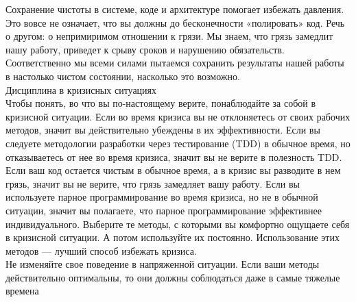 \documentclass{../industrial-development}
\begin{document}
Сохранение чистоты в системе, коде и архитектуре помогает избежать давления. Это вовсе не означает, что вы должны до бесконечности «полировать» код. Речь о другом: о непримиримом отношении к грязи. Мы знаем, что грязь замедлит нашу работу, приведет к срыву сроков и нарушению обязательств. Соответственно мы всеми силами пытаемся сохранить результаты нашей работы в настолько чистом состоянии, насколько это возможно.\\
Дисциплина в кризисных ситуациях\\
Чтобы понять, во что вы по-настоящему верите, понаблюдайте за собой в кризисной ситуации. Если во время кризиса вы не отклоняетесь от своих рабочих методов, значит вы действительно убеждены в их эффективности. Если вы следуете методологии разработки через тестирование (TDD) в обычное время, но отказываетесь от нее во время кризиса, значит вы не верите в полезность TDD. Если ваш код остается чистым в обычное время, а в кризис вы разводите в нем грязь, значит вы не верите, что грязь замедляет вашу работу. Если вы используете парное программирование во время кризиса, но не в обычной ситуации, значит вы полагаете, что парное программирование эффективнее индивидуального. Выберите те методы, с которыми вы комфортно ощущаете себя в кризисной ситуации. А потом используйте их постоянно. Использование этих методов — лучший способ избежать кризиса.\\
Не изменяйте свое поведение в напряженной ситуации. Если ваши методы действительно оптимальны, то они должны соблюдаться даже в самые тяжелые времена
\end{document}

